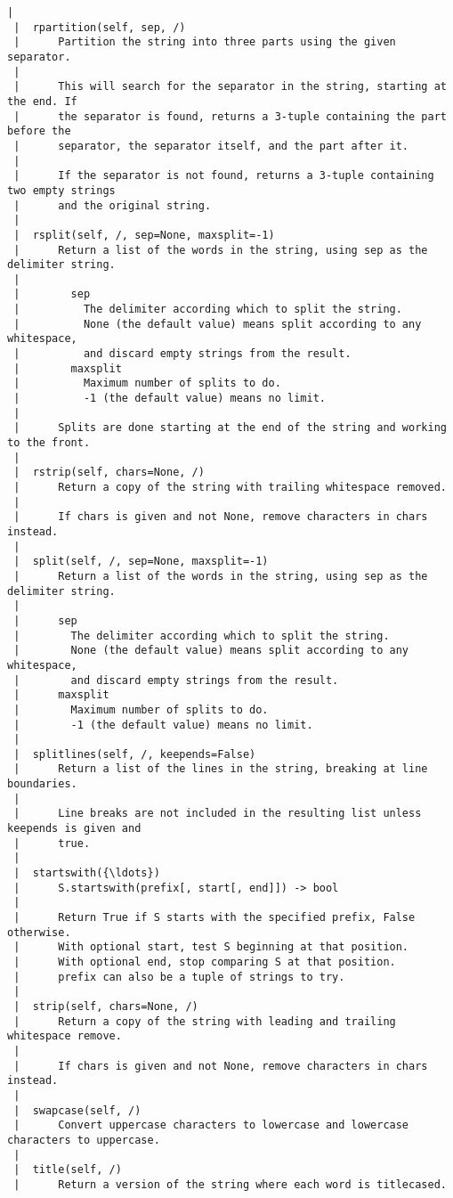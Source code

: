 \begin{Verbatim}[commandchars=\\\{\}]
 |  
 |  rpartition(self, sep, /)
 |      Partition the string into three parts using the given separator.
 |      
 |      This will search for the separator in the string, starting at the end. If
 |      the separator is found, returns a 3-tuple containing the part before the
 |      separator, the separator itself, and the part after it.
 |      
 |      If the separator is not found, returns a 3-tuple containing two empty strings
 |      and the original string.
 |  
 |  rsplit(self, /, sep=None, maxsplit=-1)
 |      Return a list of the words in the string, using sep as the delimiter string.
 |      
 |        sep
 |          The delimiter according which to split the string.
 |          None (the default value) means split according to any whitespace,
 |          and discard empty strings from the result.
 |        maxsplit
 |          Maximum number of splits to do.
 |          -1 (the default value) means no limit.
 |      
 |      Splits are done starting at the end of the string and working to the front.
 |  
 |  rstrip(self, chars=None, /)
 |      Return a copy of the string with trailing whitespace removed.
 |      
 |      If chars is given and not None, remove characters in chars instead.
 |  
 |  split(self, /, sep=None, maxsplit=-1)
 |      Return a list of the words in the string, using sep as the delimiter string.
 |      
 |      sep
 |        The delimiter according which to split the string.
 |        None (the default value) means split according to any whitespace,
 |        and discard empty strings from the result.
 |      maxsplit
 |        Maximum number of splits to do.
 |        -1 (the default value) means no limit.
 |  
 |  splitlines(self, /, keepends=False)
 |      Return a list of the lines in the string, breaking at line boundaries.
 |      
 |      Line breaks are not included in the resulting list unless keepends is given and
 |      true.
 |  
 |  startswith({\ldots})
 |      S.startswith(prefix[, start[, end]]) -> bool
 |      
 |      Return True if S starts with the specified prefix, False otherwise.
 |      With optional start, test S beginning at that position.
 |      With optional end, stop comparing S at that position.
 |      prefix can also be a tuple of strings to try.
 |  
 |  strip(self, chars=None, /)
 |      Return a copy of the string with leading and trailing whitespace remove.
 |      
 |      If chars is given and not None, remove characters in chars instead.
 |  
 |  swapcase(self, /)
 |      Convert uppercase characters to lowercase and lowercase characters to uppercase.
 |  
 |  title(self, /)
 |      Return a version of the string where each word is titlecased.

\end{Verbatim}
